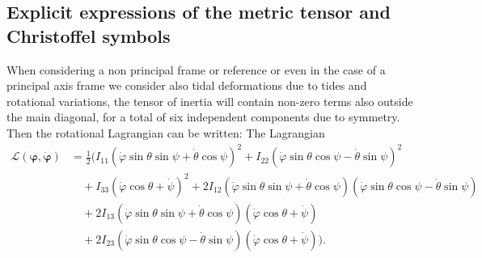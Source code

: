 \documentclass[lineno, pdflatex,sn-mathphys-ay]{sn-jnl}
\theoremstyle{thmstyleone}%
\theoremstyle{thmstyletwo}%
\theoremstyle{thmstylethree}%
\renewcommand{\vec}[1]{\boldsymbol{#1}}
\begin{document}
\begin{appendices}
		

\section[Explicit expressions]{Explicit expressions of the metric tensor and Christoffel symbols}
\label{sec:metric_tensor_christoffel_off_diagonal}

When considering a non principal frame or reference or even in the case of a principal axis frame we consider also tidal deformations due to tides and rotational variations, the tensor of inertia will contain non-zero terms also outside the main diagonal, for a total of six independent components due to symmetry. Then the rotational Lagrangian can be written: 
The Lagrangian 
\begin{align}
	\mathcal{L}(\vec{\varphi} , \dot{\vec{\varphi}})  &= \frac{1}{2} \Bigg( 
	I_{11} \left( \dot{\varphi} \sin \theta \sin \psi + \dot{\theta} \cos \psi \right)^2
	+ I_{22} \left( \dot{\varphi} \sin \theta \cos \psi - \dot{\theta} \sin \psi \right)^2 \nonumber \\
	&\quad 
	+ I_{33} \left( \dot{\varphi} \cos \theta + \dot{\psi} \right)^2 + 2 I_{12} \left( \dot{\varphi} \sin \theta \sin \psi + \dot{\theta} \cos \psi \right) 
	\left( \dot{\varphi} \sin \theta \cos \psi - \dot{\theta} \sin \psi \right) 
	\nonumber \\
	&\quad 
	+ 2 I_{13} \left( \dot{\varphi} \sin \theta \sin \psi + \dot{\theta} \cos \psi \right) 
	\left( \dot{\varphi} \cos \theta + \dot{\psi} \right) 
	\nonumber \\
	&\quad 
	+ 2 I_{23} \left( \dot{\varphi} \sin \theta \cos \psi - \dot{\theta} \sin \psi \right) 
	\left( \dot{\varphi} \cos \theta + \dot{\psi} \right) 
	\Bigg).
\end{align}



\end{appendices}
\end{document}
